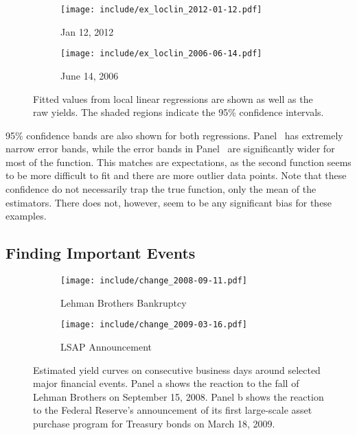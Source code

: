 \documentclass[12pt]{article}
\begin{document}
\begin{figure}[htb] \centering
    \begin{subfigure}[t]{.49\linewidth}
        \texttt{[image: include/ex\_loclin\_2012-01-12.pdf]}
        \caption{Jan 12, 2012} \label{fig:ex_loclin_1-12-2012}
    \end{subfigure}
    \begin{subfigure}[t]{.49\linewidth}
        \texttt{[image: include/ex\_loclin\_2006-06-14.pdf]}
        \caption{June 14, 2006} \label{fig:ex_loclin_6-14-2006}
    \end{subfigure}
    \caption{Fitted values from local linear regressions are shown as well as the raw yields. The shaded regions indicate the 95\% confidence intervals.}
    \label{fig:ex_loclin}
\end{figure}

95\% confidence bands are also shown for both regressions. Panel~ has extremely narrow error bands, while the error bands in Panel~ are significantly wider for most of the function. This matches are expectations, as the second function seems to be more difficult to fit and there are more outlier data points. Note that these confidence do not necessarily trap the true function, only the mean of the estimators. There does not, however, seem to be any significant bias for these examples.


\subsection{Finding Important Events}

\begin{figure}[htb] \centering
    \begin{subfigure}[t]{.49\linewidth}
        \texttt{[image: include/change\_2008-09-11.pdf]}
        \caption{Lehman Brothers Bankruptcy} \label{fig:events_lehman}
    \end{subfigure}
    \begin{subfigure}[t]{.49\linewidth}
        \texttt{[image: include/change\_2009-03-16.pdf]}
        \caption{LSAP Announcement} \label{fig:events_lsap}
    \end{subfigure}
    \caption{Estimated yield curves on consecutive business days around selected major financial events. Panel a shows the reaction to the fall of Lehman Brothers on September 15, 2008. Panel b shows the reaction to the Federal Reserve's announcement of its first large-scale asset purchase program for Treasury bonds on March 18, 2009. }
    \label{fig:events}
\end{figure}
\end{document}
